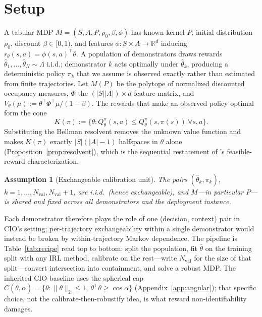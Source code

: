 \documentclass{article}
\newtheorem{assumption}{Assumption}
\begin{document}
\section{Setup}
\label{sec:setting}

A tabular MDP $M=(S,A,P,\rho_0,\beta,\phi)$ has known kernel $P$, initial
distribution $\rho_0$, discount $\beta\in[0,1)$, and features
$\phi:S\times A\to\mathbb R^d$ inducing $r_\theta(s,a)=\phi(s,a)^\top\theta$.
A population of demonstrators draws rewards
$\hat\theta_1,\dots,\hat\theta_N\sim\Lambda$ i.i.d.; demonstrator $k$ acts
optimally under $\hat\theta_k$, producing a deterministic policy $\pi_k$ that we
assume is observed exactly rather than estimated from finite trajectories. Let
$M(P)$ be the polytope of normalized discounted occupancy measures, $\Phi$ the
$(|S||A|)\times d$ feature matrix, and
$V_\theta(\mu):=\theta^\top\Phi^\top\mu/(1-\beta)$. The rewards that make an
observed policy optimal form the cone
\[
K(\pi):=\{\theta:Q^\pi_\theta(s,a)\le Q^\pi_\theta(s,\pi(s))\ \forall s,a\}.
\]
Substituting the Bellman resolvent removes the unknown value function and makes
$K(\pi)$ exactly $|S|(|A|-1)$ halfspaces in $\theta$ alone
(Proposition~\ref{prop:resolvent}), which is the sequential restatement of
\citeauthor{ng2000algorithms}'s feasible-reward characterization.

\begin{assumption}[Exchangeable calibration unit]
\label{ass:unit}
The pairs $(\hat\theta_k,\pi_k)$,
$k=1,\dots,N_{\mathrm{val}},N_{\mathrm{val}}{+}1$, are i.i.d.\ (hence
exchangeable), and $M$---in particular $P$---is shared and fixed across all
demonstrators and the deployment instance.
\end{assumption}

Each demonstrator therefore plays the role of one (decision, context) pair in
CIO's setting; per-trajectory exchangeability within a single demonstrator
would instead be broken by within-trajectory Markov dependence. The pipeline is
Table~\ref{tab:recipe} read top to bottom: split the population, fit
$\bar\theta$ on the training split with any IRL method, calibrate on the
rest---write $N_{\mathrm{val}}$ for the size of that split---convert
intersection into containment, and solve a robust MDP. The
inherited CIO baseline uses the spherical cap
$C(\bar\theta,\alpha)=\{\theta:\|\theta\|_2\le1,\
\theta^\top\bar\theta\ge\cos\alpha\}$ (Appendix~\ref{app:angular}); that
specific choice, not the calibrate-then-robustify idea, is what reward
non-identifiability damages.
\end{document}

